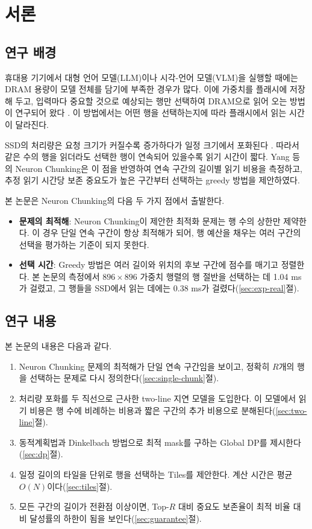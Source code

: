 \chapter{서론}\label{chap:introduction}

\section{연구 배경}\label{sec:intro-background}

휴대용 기기에서 대형 언어 모델(LLM)이나 시각-언어 모델(VLM)을 실행할 때에는 DRAM 용량이 모델 전체를 담기에 부족한 경우가 많다. 이에 가중치를 플래시에 저장해 두고, 입력마다 중요할 것으로 예상되는 행만 선택하여 DRAM으로 읽어 오는 방법이 연구되어 왔다 \cite{alizadeh2024}. 이 방법에서는 어떤 행을 선택하는지에 따라 플래시에서 읽는 시간이 달라진다.

SSD의 처리량은 요청 크기가 커질수록 증가하다가 일정 크기에서 포화된다 \cite{jeong2013}. 따라서 같은 수의 행을 읽더라도 선택한 행이 연속되어 있을수록 읽기 시간이 짧다. Yang 등 \cite{yang2025}의 Neuron Chunking은 이 점을 반영하여 연속 구간의 길이별 읽기 비용을 측정하고, 추정 읽기 시간당 보존 중요도가 높은 구간부터 선택하는 greedy 방법을 제안하였다.

본 논문은 Neuron Chunking의 다음 두 가지 점에서 출발한다.

\begin{itemize}
\item \textbf{문제의 최적해}: Neuron Chunking이 제안한 최적화 문제는 행 수의 상한만 제약한다. 이 경우 단일 연속 구간이 항상 최적해가 되어, 행 예산을 채우는 여러 구간의 선택을 평가하는 기준이 되지 못한다.
\item \textbf{선택 시간}: Greedy 방법은 여러 길이와 위치의 후보 구간에 점수를 매기고 정렬한다. 본 논문의 측정에서 $896\times896$ 가중치 행렬의 행 절반을 선택하는 데 1.04 ms가 걸렸고, 그 행들을 SSD에서 읽는 데에는 0.38 ms가 걸렸다(\ref{sec:exp-real}절).
\end{itemize}

\section{연구 내용}\label{sec:intro-contributions}

본 논문의 내용은 다음과 같다.

\begin{enumerate}
\item Neuron Chunking 문제의 최적해가 단일 연속 구간임을 보이고, 정확히 $R$개의 행을 선택하는 문제로 다시 정의한다(\ref{sec:single-chunk}절).
\item 처리량 포화를 두 직선으로 근사한 two-line 지연 모델을 도입한다. 이 모델에서 읽기 비용은 행 수에 비례하는 비용과 짧은 구간의 추가 비용으로 분해된다(\ref{sec:two-line}절).
\item 동적계획법과 Dinkelbach 방법으로 최적 mask를 구하는 Global DP를 제시한다(\ref{sec:dp}절).
\item 일정 길이의 타일을 단위로 행을 선택하는 Tiles를 제안한다. 계산 시간은 평균 $O(N)$이다(\ref{sec:tiles}절).
\item 모든 구간의 길이가 전환점 이상이면, Top-$R$ 대비 중요도 보존율이 최적 비율 대비 달성률의 하한이 됨을 보인다(\ref{sec:guarantee}절).
\end{enumerate}

